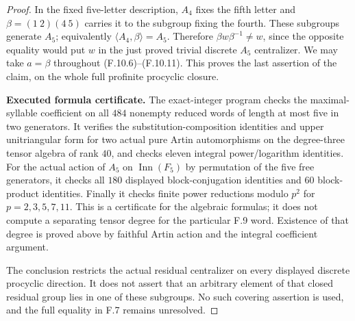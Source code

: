 \begin{proof}
In the fixed five-letter description, $A_4$ fixes
the fifth letter and
$\beta=(1\ 2)(4\ 5)$ carries it to the subgroup
fixing the fourth.  These subgroups generate $A_5$;
equivalently $\langle A_4,\beta\rangle=A_5$.
Therefore $\beta w\beta^{-1}\ne w$, since the
opposite equality would put $w$ in the just proved
trivial discrete $A_5$ centralizer.  We may take
$a=\beta$ throughout (F.10.6)--(F.10.11).
This proves the last assertion of the claim, on
the whole full profinite procyclic closure.

\textbf{Executed formula certificate.}
The exact-integer program
checks the maximal-syllable coefficient on all $484$
nonempty reduced words of length at most five in two
generators.  It verifies the substitution-composition
identities and upper unitriangular form for two actual
pure Artin automorphisms on the degree-three tensor
algebra of rank $40$, and checks eleven integral
power/logarithm identities.  For the actual action of
$A_5$ on $\operatorname{Inn}(F_5)$ by permutation of
the five free generators, it checks all $180$
displayed block-conjugation identities and $60$
block-product identities.  Finally it checks finite
power reductions modulo $p^2$ for $p=2,3,5,7,11$.
This is a certificate for the algebraic formulas;
it does not compute a separating tensor degree for
the particular F.9 word.  Existence of that degree
is proved above by faithful Artin action and the
integral coefficient argument.

The conclusion restricts the actual residual
centralizer on every displayed discrete procyclic
direction.  It does not assert that an arbitrary
element of that closed residual group lies in one
of these subgroups.  No such covering assertion is
used, and the full equality in F.7 remains unresolved.
\end{proof}
